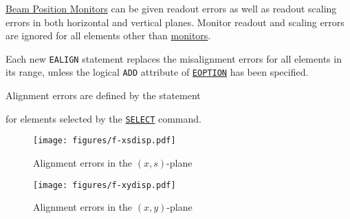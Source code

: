 \hyperref[sec:monitor]{Beam Position Monitors} can be given readout errors as 
well as readout scaling errors in both horizontal and vertical planes. 
Monitor readout and scaling errors are ignored for all elements other than 
\hyperref[sec:monitor]{monitors}.

Each new \texttt{EALIGN} statement replaces the misalignment errors for all 
elements in its range, unless the logical \texttt{ADD} attribute of 
\hyperref[sec:eoption]{\texttt{EOPTION}} has been specified.

Alignment errors are defined by the statement 

for elements selected by the
\hyperref[sec:select]{\texttt{SELECT}} command. 

\begin{figure}[ht]
	\centering
	\setlength{\unitlength}{1pt}
	\texttt{[image: figures/f-xsdisp.pdf]}
	\caption{Alignment errors in the $(x,s)$-plane}
	\label{F-XSDISP}
\end{figure}

\begin{figure}[htb]
	\centering
	\setlength{\unitlength}{1pt}
	\texttt{[image: figures/f-xydisp.pdf]}
	\caption{Alignment errors in the $(x,y)$-plane}
	\label{F-XYDISP}
\end{figure}


